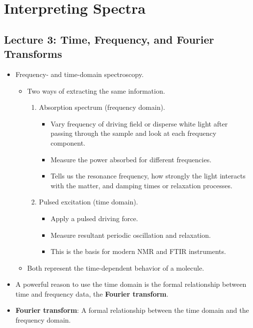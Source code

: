 \documentclass[../notes.tex]{subfiles}
\begin{document}
\chapter{Interpreting Spectra}
\section{Lecture 3: Time, Frequency, and Fourier Transforms}
\begin{itemize}
    \item {}Frequency- and time-domain spectroscopy.
    \begin{itemize}
        \item Two ways of extracting the same information.
        \begin{enumerate}
            \item Absorption spectrum (frequency domain).
            \begin{itemize}
                \item Vary frequency of driving field or disperse white light after passing through the sample and look at each frequency component.
                \item Measure the power absorbed for different frequencies.
                \item Tells us the resonance frequency, how strongly the light interacts with the matter, and damping times or relaxation processes.
            \end{itemize}
            \item Pulsed excitation (time domain).
            \begin{itemize}
                \item Apply a pulsed driving force.
                \item Measure resultant periodic oscillation and relaxation.
                \item This is the basis for modern NMR and FTIR instruments.
            \end{itemize}
        \end{enumerate}
        \item Both represent the time-dependent behavior of a molecule.
    \end{itemize}
    \item A powerful reason to use the time domain is the formal relationship between time and frequency data, the \textbf{Fourier transform}.
    \item \textbf{Fourier transform}: A formal relationship between the time domain and the frequency domain.

\end{itemize}
\end{document}
